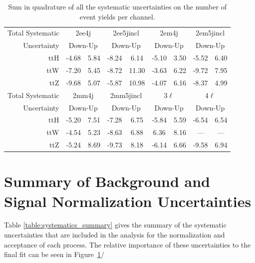 \begin{table}
\begin{center}
\begin{tabular}{r|cc|cc|cc|cc|}
Total Systematic & \multicolumn{2}{c|}{2ee4j} & \multicolumn{2}{c|}{2ee5jincl} & \multicolumn{2}{c|}{2em4j} & \multicolumn{2}{c|}{2em5jincl} \\ 
Uncertainty & \multicolumn{2}{c|}{Down-Up} & \multicolumn{2}{c|}{Down-Up} & \multicolumn{2}{c|}{Down-Up} & \multicolumn{2}{c|}{Down-Up} \\ 
\hline 
ttH & -4.68 & 5.84 & -8.24 & 6.14 & -5.10 & 3.50 & -5.52 & 6.40   \\ 
ttW & -7.20 & 5.45 & -8.72 & 11.30 & -3.63 & 6.22 & -9.72 & 7.95 \\ 
ttZ & -9.68 & 5.07 & -5.87 & 10.98 & -4.07 & 6.16 & -8.37 & 4.99 \\ 
\hline 
Total Systematic & \multicolumn{2}{c|}{2mm4j}& \multicolumn{2}{c|}{2mm5jincl} & \multicolumn{2}{c|}{3$\ell$} & \multicolumn{2}{c|}{4$\ell$} \\ 
Uncertainty & \multicolumn{2}{c|}{Down-Up} &\multicolumn{2}{c|}{Down-Up} & \multicolumn{2}{c|}{Down-Up} & \multicolumn{2}{c|}{Down-Up} \\ 
\hline 
ttH &-5.20 & 7.51& -7.28 & 6.75 & -5.84 & 5.59 & -6.54 & 6.54\\ 
ttW &-4.54 & 5.23& -8.63 & 6.88 &  6.36 & 8.16 & --- & --- \\ 
ttZ &-5.24 & 8.69& -9.73 & 8.18 & -6.14 & 6.66 & -9.58 & 6.94\\ 
\end{tabular} 
\caption{Sum in quadrature of all the systematic uncertainties on the number of event yields per channel.}
\label{table:systematics_total_detector} 
\end{center} 
\end{table} 


\section{Summary of Background and Signal Normalization Uncertainties}

Table \ref{table:systematics_summary} gives the summary of the systematic uncertainties that are included in the analysis for the normalization and acceptance of each process. The relative importance of these uncertainties to the final fit can be seen in Figure~\ref{}/  


